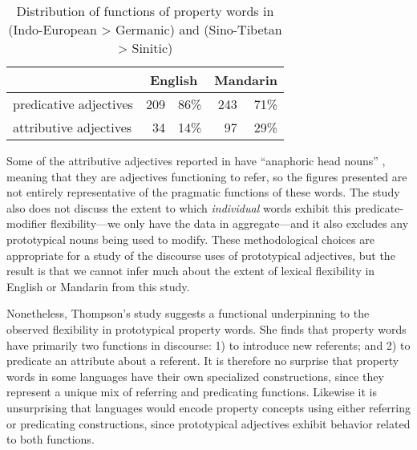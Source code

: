 \begin{table}[h]
  \centering
  \caption[Distribution of functions of property words in English (Indo-European > Germanic) and Mandarin (Sino-Tibetan > Sinitic)]{Distribution of functions of property words in  (Indo-European > Germanic) and  (Sino-Tibetan > Sinitic) \parencite[253, 257]{Thompson1989}}
  \label{tab:Thompson-1989}
  \begin{tabular}{ l r r r r }
    \toprule
      {                    } & \multicolumn{2}{c}{English} & \multicolumn{2}{c}{Mandarin} \\
    \midrule
      predicative adjectives & 209 & 86\%                  & 243 & 71\% \\
      attributive adjectives &  34 & 14\%                  &  97 & 29\% \\
    \bottomrule
  \end{tabular}
\end{table}

Some of the attributive adjectives reported in  have \enquote{anaphoric head nouns} \parencite[258]{Thompson1989}, meaning that they are adjectives functioning to refer, so the figures presented are not entirely representative of the pragmatic functions of these words. The study also does not discuss the extent to which \emph{individual} words exhibit this predicate-modifier flexibility—we only have the data in aggregate—and it also excludes any prototypical nouns being used to modify. These methodological choices are appropriate for a study of the discourse uses of prototypical adjectives, but the result is that we cannot infer much about the extent of lexical flexibility in English or Mandarin from this study.

Nonetheless, Thompson's study suggests a functional underpinning to the observed flexibility in prototypical property words. She finds that property words have primarily two functions in discourse: 1) to introduce new referents; and 2) to predicate an attribute about a referent. It is therefore no surprise that property words in some languages have their own specialized constructions, since they represent a unique mix of referring and predicating functions. Likewise it is unsurprising that languages would encode property concepts using either referring or predicating constructions, since prototypical adjectives exhibit behavior related to both functions.

